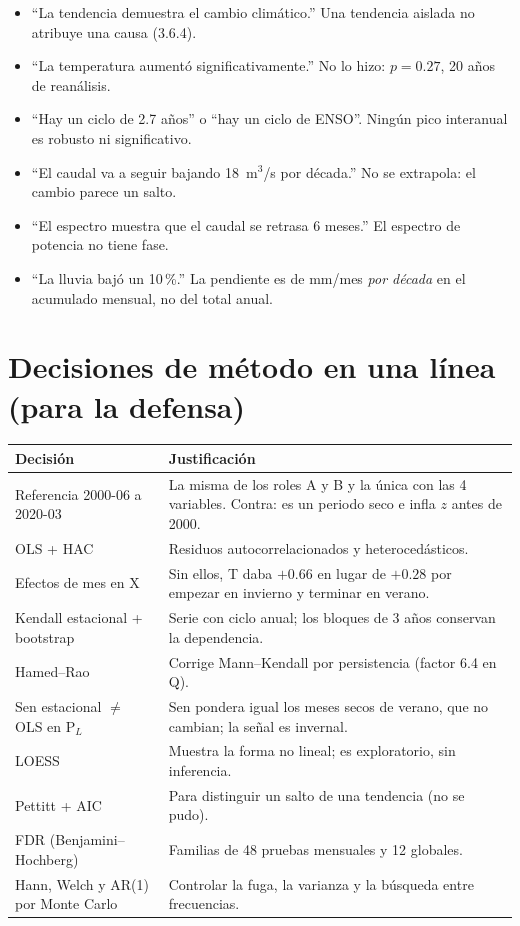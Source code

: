 \documentclass[11pt,letterpaper]{article}
\begin{document}
\begin{itemize}
\item ``La tendencia demuestra el cambio climático.'' Una tendencia aislada no atribuye una causa (3.6.4).
\item ``La temperatura aumentó significativamente.'' No lo hizo: $p=0.27$, 20 años de reanálisis.
\item ``Hay un ciclo de 2.7 años'' o ``hay un ciclo de ENSO''. Ningún pico interanual es robusto ni significativo.
\item ``El caudal va a seguir bajando 18~m$^3$/s por década.'' No se extrapola: el cambio parece un salto.
\item ``El espectro muestra que el caudal se retrasa 6 meses.'' El espectro de potencia no tiene fase.
\item ``La lluvia bajó un 10\,\%.'' La pendiente es de mm/mes \emph{por década} en el acumulado mensual, no del total anual.
\end{itemize}

\section{Decisiones de método en una línea (para la defensa)}

\begin{table}[H]
\centering\small
\begin{tabularx}{\textwidth}{l X}
\toprule
Decisión & Justificación \\
\midrule
Referencia 2000-06 a 2020-03 & La misma de los roles A y B y la única con las 4 variables. Contra: es un periodo seco e infla $z$ antes de 2000. \\
OLS + HAC & Residuos autocorrelacionados y heterocedásticos. \\
Efectos de mes en X & Sin ellos, T daba $+0.66$ en lugar de $+0.28$ por empezar en invierno y terminar en verano. \\
Kendall estacional + bootstrap & Serie con ciclo anual; los bloques de 3 años conservan la dependencia. \\
Hamed--Rao & Corrige Mann--Kendall por persistencia (factor 6.4 en Q). \\
Sen estacional $\neq$ OLS en P$_L$ & Sen pondera igual los meses secos de verano, que no cambian; la señal es invernal. \\
LOESS & Muestra la forma no lineal; es exploratorio, sin inferencia. \\
Pettitt + AIC & Para distinguir un salto de una tendencia (no se pudo). \\
FDR (Benjamini--Hochberg) & Familias de 48 pruebas mensuales y 12 globales. \\
Hann, Welch y AR(1) por Monte Carlo & Controlar la fuga, la varianza y la búsqueda entre frecuencias. \\
\bottomrule
\end{tabularx}
\end{table}
\end{document}
